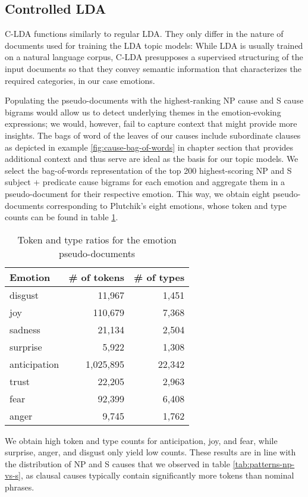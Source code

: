 \subsection{Controlled LDA}

C-LDA functions similarly to regular LDA. They only differ in the nature of documents used for training the LDA topic models: While LDA is usually trained on a natural language corpus, C-LDA presupposes a supervised structuring of the input documents so that they convey semantic information that characterizes the required categories, in our case emotions.

Populating the pseudo-documents with the highest-ranking NP cause and S cause bigrams would allow us to detect underlying themes in the emotion-evoking expressions; we would, however, fail to capture context that might provide more insights. The bags of word of the leaves of our causes include subordinate clauses as depicted in example \ref{fig:cause-bag-of-words} in chapter \label{ch:patterns} section \label{sec:extraction} that provides additional context and thus serve are ideal as the basis for our topic models. We select the bag-of-words representation of the top 200 highest-scoring NP and S subject + predicate cause bigrams for each emotion and aggregate them in a pseudo-document for their respective emotion. This way, we obtain eight pseudo-documents corresponding to Plutchik's eight emotions, whose token and type counts can be found in table \ref{tab:token-type-pseudo-doc}.

\begin{table}[]
\centering
\begin{tabular}{l|r|r}
{\bf Emotion} & {\bf \# of tokens} & {\bf \# of types} \\\hline
disgust & 11,967 & 1,451 \\
joy & 110,679 & 7,368 \\
sadness & 21,134 & 2,504 \\
surprise & 5,922 & 1,308 \\
anticipation & 1,025,895 & 22,342 \\
trust & 22,205 & 2,963 \\
fear & 92,399 & 6,408 \\
anger & 9,745 & 1,762
\end{tabular}
\caption{Token and type ratios for the emotion pseudo-documents}
\label{tab:token-type-pseudo-doc}
\end{table}

We obtain high token and type counts for anticipation, joy, and fear, while surprise, anger, and disgust only yield low counts. These results are in line with the distribution of NP and S causes that we observed in table \ref{tab:patterns-np-vs-s}, as clausal causes typically contain significantly more tokens than nominal phrases.

